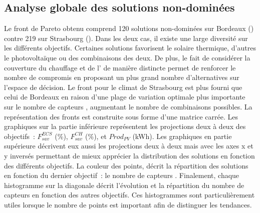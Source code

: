 \subsection{Analyse globale des solutions non-dominées} %
\label{sub:analyse_globale_des_solutions_non_dominees}
Le front de Pareto obtenu comprend \num{120} solutions non-dominées sur Bordeaux
() contre \num{219} sur Strasbourg
(). Dans les deux cas, il existe une large diversité
sur les différents objectifs. Certaines solutions favorisent le solaire thermique,
d’autres le photovoltaïque ou des combinaisons des deux. De plus, le fait de considérer
la couverture du chauffage et de l’ de manière distincte permet de renforcer le
nombre de compromis en proposant un plus grand nombre d’alternatives sur l’espace de décision.
Le front pour le climat de Strasbourg est plus fourni que celui de Bordeaux en raison d’une plage de variation
optimale plus importante sur le nombre de capteurs , augmentant le nombre de
combinaisons possibles.
La représentation des fronts est construite sous forme d’une matrice carrée.
Les graphiques sur la partie inférieure représentent les projections deux à deux des objectifs~:
$F_{sav}^{ECS}$ (\si{\percent}), $F_{sav}^{CH}$ (\si{\percent}), et $Prod_{PV}$ (\si{kWh}).
Les graphiques en partie supérieure décrivent eux aussi les projections deux à deux mais
avec les axes x et y inversés permettant de mieux
apprécier la distribution des solutions en fonction des différents objectifs. La couleur des points,
décrit la répartition des solutions en fonction du dernier objectif~: le nombre de capteurs .
Finalement, chaque histogramme sur la diagonale décrit l’évolution et la répartition du
nombre de capteurs  en fonction des autres objectifs. Ces histogrammes sont
particulièrement utiles lorsque le nombre de points est important afin de distinguer
les tendances.

